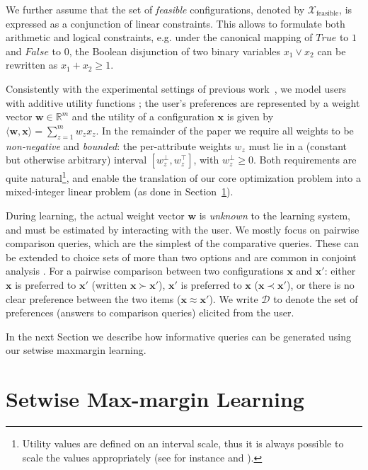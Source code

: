 \documentclass{article}
\renewcommand\[{\begin{equation}}
\renewcommand\]{\end{equation}}
\newcommand{\bbR}{\mathbb{R}}
\newcommand{\calvar}[1]{\ensuremath{\mathcal{#1}}}
\newcommand{\calD}{\calvar{D}}
\newcommand{\calX}{\calvar{X}}
\newcommand{\vecvar}[1]{\ensuremath{\boldsymbol{#1}}}
\newcommand{\vw}{\vecvar{w}}
\newcommand{\vx}{\vecvar{x}}
\begin{document}
We further assume that the set of {\em feasible} configurations, denoted by
$\calX_\text{feasible}$, is expressed as
a conjunction of linear constraints. This allows to formulate both arithmetic
and logical constraints,
e.g. under the canonical mapping of $True$ to $1$ and $False$ to $0$, the
Boolean disjunction of two binary variables $x_1 \lor x_2$ can be rewritten as
$x_1 + x_2 \ge 1$.

Consistently with the experimental settings of previous work~\cite{guo2010real,viappiani2010optimal},
we model users with additive utility functions \cite{keeney1976}; 
the user's preferences are represented by a  weight
vector $\vw\in\bbR^m$ and
the utility of a configuration $\vx$ is given by
$\langle \vw, \vx \rangle = \sum_{z=1}^m w_z x_z$. 
In the remainder of the paper we
require all weights to be {\em non-negative} and {\em bounded}: the per-attribute
weights $w_z$ must lie in a (constant but otherwise arbitrary) interval
$[w^\bot_z, w^\top_z]$, with $w^\bot_z \ge 0$. 
Both requirements are quite natural\footnote{Utility values are defined on an
interval scale, thus it is always possible to scale the values appropriately (see for instance \cite{Torra2007} and \cite{keeney1976}).}, and enable the translation of our core optimization problem into a
mixed-integer linear problem (as done in Section~\ref{sec:formulation}). 

During learning, the actual weight vector $\vw$ is {\em unknown} to
the learning system, and must be estimated by interacting with the
user. We mostly focus on pairwise comparison queries, which are the
simplest of the comparative queries. These can be extended to choice
sets of more than two options
\cite{viappiani2009,viappiani2010optimal} and are common in conjoint analysis
\cite{louviere2000,toubia2004}. %
For a pairwise comparison between two configurations $\vx$ and $\vx'$:
either $\vx$ is preferred to $\vx'$ (written $\vx \succ \vx'$), $\vx'$
is preferred to $\vx$ ($\vx \prec \vx'$), or there is no clear
preference between the two items ($\vx \approx \vx'$). We write
$\calD$ to denote the set of preferences (answers to comparison
queries) elicited from the user. 

In the next Section we describe how informative queries can be generated using our setwise maxmargin learning.

\section{Setwise Max-margin Learning}
\label{sec:formulation}
\end{document}
